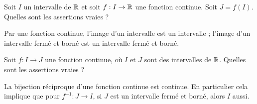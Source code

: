 \begin{question}
Soit $I$ un intervalle de $\mathbb{R}$ et soit $f : I \to \mathbb{R}$ une fonction continue. Soit $J=f(I)$. Quelles sont les assertions vraies ?
\begin{answers}



\end{answers}
\begin{explanations}
Par une fonction continue, l'image d'un intervalle est un intervalle ;
l'image d'un intervalle fermé et borné est un intervalle fermé et borné. 
\end{explanations}
\end{question}


\begin{question}
Soit $f : I \to J$ une fonction continue, où $I$ et $J$ sont des intervalles de $\mathbb{R}$. Quelles sont les assertions vraies ?
\begin{answers}



\end{answers}
\begin{explanations}
La bijection réciproque d'une fonction continue est continue. En particulier cela implique que pour $f^{-1} : J \to I$, si $J$ est un intervalle fermé et borné, alors $I$ aussi.
\end{explanations}
\end{question}

